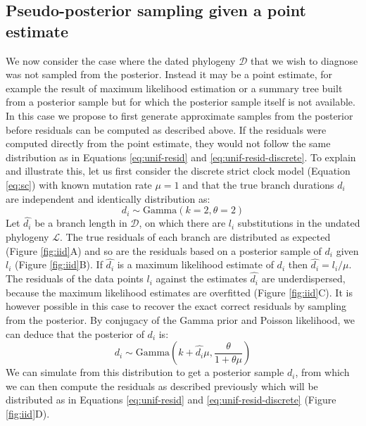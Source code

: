 \documentclass{article}
\begin{document}
\subsection*{Pseudo-posterior sampling given a point estimate}

We now consider the case where the dated phylogeny $\mathcal{D}$ that we wish
to diagnose was not sampled from the posterior. Instead it may be a point estimate, 
for example the result of maximum likelihood estimation
or a summary tree built from a posterior sample \citep{heledLookingTreesForest2013}
but for which the posterior sample itself is not available.
In this case we propose to first generate approximate 
samples from the posterior before residuals can be computed as described above.
If the residuals were computed directly from the point estimate, they would not follow the same distribution as in Equations
\ref{eq:unif-resid} and \ref{eq:unif-resid-discrete}.
To explain and illustrate this, let us first consider the discrete strict clock model (Equation \ref{eq:sc})
with known mutation rate $\mu=1$
and that the true branch durations $d_i$ are independent and identically
distribution as:
\begin{equation}
d_i \sim \mathrm{Gamma}(k=2,\theta=2)
\end{equation}
Let $\hat{d_i}$ be a branch length in $\mathcal{D}$, on which there are $l_i$ substitutions in the undated phylogeny $\mathcal{L}$. 
The true residuals of each branch are distributed as expected (Figure \ref{fig:iid}A)
and so are the residuals based on a posterior sample of $d_i$ given $l_i$ (Figure \ref{fig:iid}B).
If $\hat{d_i}$ is a maximum likelihood estimate of $d_i$ then
$\hat{d_i}=l_i/\mu$.
The residuals of the data points $l_i$ against the estimates $\hat{d_i}$ are
underdispersed, because the maximum likelihood estimates are overfitted (Figure \ref{fig:iid}C).
It is however possible in this case to recover the exact correct residuals by sampling from
the posterior. 
By conjugacy of the Gamma prior and Poisson likelihood, we can deduce that the posterior of $d_i$ is:
\begin{equation}
d_i \sim \mathrm{Gamma}\left(k+\hat{d_i} \mu,\frac{\theta}{1+\theta \mu}\right)
\end{equation}
We can simulate from this distribution to get a posterior sample $d_i$, from which we can then compute the residuals as 
described previously which will be distributed as in 
Equations \ref{eq:unif-resid} and \ref{eq:unif-resid-discrete} (Figure \ref{fig:iid}D).
\end{document}
